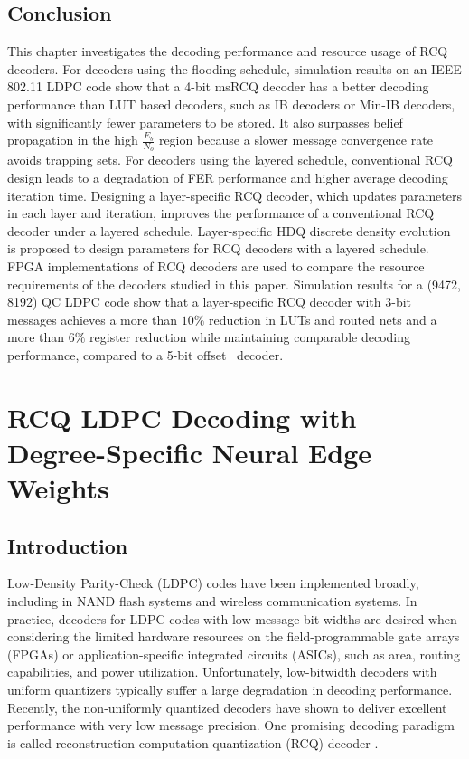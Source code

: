 \documentclass [PhD] {uclathes}
\begin{document}
\section{Conclusion}\label{sec: conclusion}
This chapter investigates the decoding performance and resource usage of RCQ decoders. For decoders using the flooding schedule, simulation results on an IEEE 802.11 LDPC code show that a 4-bit msRCQ decoder has a better decoding performance than LUT based decoders, such as IB decoders or Min-IB decoders, with significantly fewer parameters to be stored. It also surpasses belief propagation in the high $\frac{E_b}{N_o}$ region because a slower message convergence rate avoids trapping sets. For decoders using the layered schedule, conventional RCQ design leads to a degradation of FER performance and higher average decoding iteration time. Designing a layer-specific RCQ decoder, which updates parameters in each layer and iteration, improves the performance of a conventional RCQ decoder under a layered schedule.
Layer-specific HDQ discrete density evolution is proposed to design parameters for RCQ decoders with a layered schedule. FPGA implementations of RCQ decoders are used to compare the resource requirements of the decoders studied in this paper. 
Simulation results for a (9472, 8192) QC LDPC code show that a layer-specific \minsum RCQ decoder with 3-bit messages achieves a more than $10\%$ reduction in LUTs and routed nets and a more than $6\%$ register reduction while maintaining comparable decoding performance, compared to a 5-bit offset \minsum~decoder.

\chapter{RCQ LDPC Decoding with Degree-Specific Neural Edge Weights} \label{cpt: W_RCQ}
\section{Introduction}
Low-Density Parity-Check  (LDPC) codes \cite{GallagerPhD1963} have been implemented broadly, including in NAND flash systems and wireless communication systems. In practice, decoders for LDPC codes with low message bit widths are desired when considering the limited hardware resources on the field-programmable gate arrays (FPGAs) or application-specific integrated circuits (ASICs), such as area, routing capabilities, and power utilization. Unfortunately, low-bitwidth decoders with uniform quantizers typically suffer a large degradation in decoding performance\cite{Lee2005-RFQThorpe}. Recently, the non-uniformly quantized decoders  \cite{Planjery2012-FAID,Xiao2020-sb, Lewandowsky2018-IB,Stark2018-IBMA,Stark2019-IBPBRL,Lee2005-RFQThorpe,He2019-RFQCai, Wang2020-kh,terrill2021fpga,wang2022TCOMRCQ}  have shown to deliver excellent performance with very low message precision. One promising decoding paradigm is called reconstruction-computation-quantization (RCQ) decoder \cite{Wang2020-kh,terrill2021fpga,wang2022TCOMRCQ}. 
 
\end{document}

